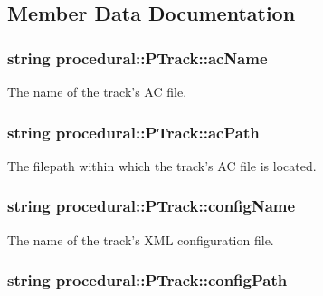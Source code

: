 \subsection{Member Data Documentation}
\hypertarget{classprocedural_1_1_p_track_a7fc4bf8b022038141cf4f50755bcb14d}{
\subsubsection[{ac\-Name}]{\setlength{\rightskip}{0pt plus 5cm}string procedural\-::\-P\-Track\-::ac\-Name\hspace{0.3cm}{\ttfamily [private]}}}\label{classprocedural_1_1_p_track_a7fc4bf8b022038141cf4f50755bcb14d}
The name of the track's A\-C file. \hypertarget{classprocedural_1_1_p_track_ae9e88a321deabda8a92688e364e23513}{
\subsubsection[{ac\-Path}]{\setlength{\rightskip}{0pt plus 5cm}string procedural\-::\-P\-Track\-::ac\-Path\hspace{0.3cm}{\ttfamily [private]}}}\label{classprocedural_1_1_p_track_ae9e88a321deabda8a92688e364e23513}
The filepath within which the track's A\-C file is located. \hypertarget{classprocedural_1_1_p_track_a9ea72d121db71e2a284375a381ddb310}{
\subsubsection[{config\-Name}]{\setlength{\rightskip}{0pt plus 5cm}string procedural\-::\-P\-Track\-::config\-Name\hspace{0.3cm}{\ttfamily [private]}}}\label{classprocedural_1_1_p_track_a9ea72d121db71e2a284375a381ddb310}
The name of the track's X\-M\-L configuration file. \hypertarget{classprocedural_1_1_p_track_a1b5bfa2efcabace6e87dd8e8c482639a}{
\subsubsection[{config\-Path}]{\setlength{\rightskip}{0pt plus 5cm}string procedural\-::\-P\-Track\-::config\-Path\hspace{0.3cm}{\ttfamily [private]}}}\label{classprocedural_1_1_p_track_a1b5bfa2efcabace6e87dd8e8c482639a}
